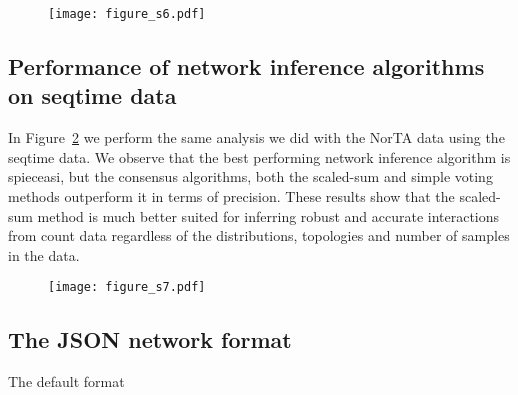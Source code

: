     \begin{figure}[H]
      \centering
      \texttt{[image: figure\_s6.pdf]}
    \end{figure}
    \begin{figure}[H]
      \centering
        \caption{
        }
      \label{fig:figure_s6}
    \end{figure}
    \FloatBarrier
    \newpage


  \subsection*{Performance of network inference algorithms on seqtime data}

    In Figure~\ref{fig:figure_s7} we perform the same analysis we did with the NorTA data using the seqtime data.
    We observe that the best performing network inference algorithm is \ac{spieceasi}, but the consensus algorithms, both the scaled-sum and simple voting methods outperform it in terms of precision.
    These results show that the scaled-sum method is much better suited for inferring robust and accurate interactions from count data regardless of the distributions, topologies and number of samples in the data.

    \begin{figure}[H]
      \centering
      \texttt{[image: figure\_s7.pdf]}
    \end{figure}
    \begin{figure}[H]
      \centering
        \caption{
        }
      \label{fig:figure_s7}
    \end{figure}
    \FloatBarrier
    \newpage


  \subsection*{The JSON network format}

    The default format
